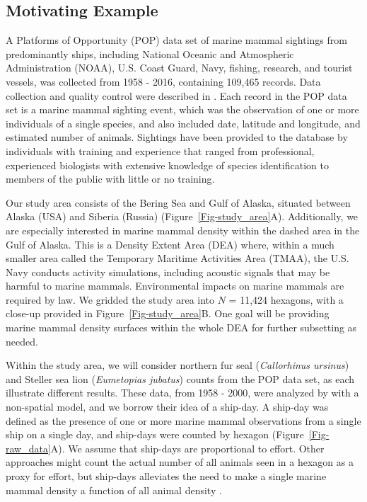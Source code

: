 \documentclass[11pt, titlepage]{article}
\begin{document}
\begin{spacing}{1.9}
\begin{flushleft}

\subsection{Motivating Example} \label{sec:motex}

A Platforms of Opportunity (POP) data set of marine mammal sightings from predominantly ships, including National Oceanic and Atmospheric Administration (NOAA), U.S. Coast Guard, Navy, fishing, research, and tourist vessels, was collected from 1958 - 2016, containing 109,465 records. Data collection and quality control were described in \citet{HimesBoorEtAl2012Stellersealion}. Each record in the POP data set is a marine mammal sighting event, which was the observation of one or more individuals of a single species, and also included date, latitude and longitude, and estimated number of animals. Sightings have been provided to the database by individuals with training and experience that ranged from professional, experienced biologists with extensive knowledge of species identification to members of the public with little or no training.

Our study area consists of the Bering Sea and Gulf of Alaska, situated between Alaska (USA) and Siberia (Russia) (Figure~\ref{Fig-study_area}A). Additionally, we are especially interested in marine mammal density within the dashed area in the Gulf of Alaska.  This is a Density Extent Area (DEA) where, within a much smaller area called the Temporary Maritime Activities Area (TMAA), the U.S. Navy conducts activity simulations, including acoustic signals that may be harmful to marine mammals. Environmental impacts on marine mammals are required by law. We gridded the study area into $N$ = 11,424 hexagons, with a close-up provided in Figure~\ref{Fig-study_area}B. One goal will be providing marine mammal density surfaces within the whole DEA for further subsetting as needed. 

Within the study area, we will consider northern fur seal (\textit{Callorhinus ursinus}) and Steller sea lion (\textit{Eumetopias jubatus}) counts from the POP data set, as each illustrate different results.  These data, from 1958 - 2000, were analyzed by \citet{HimesBoorEtAl2012Stellersealion} with a non-spatial model, and we borrow their idea of a ship-day.    A ship-day was defined as the presence of one or more marine mammal observations from a single ship on a single day, and ship-days were counted by hexagon (Figure~\ref{Fig-raw_data}A).  We assume that ship-days are proportional to effort.  Other approaches might count the actual number of all animals seen in a hexagon as a proxy for effort, but ship-days alleviates the need to make a single marine mammal density a function of all animal density \citep{HimesBoorEtAl2012Stellersealion}.


\end{flushleft}
\end{spacing}
\end{document}
